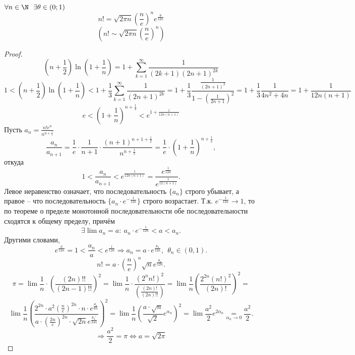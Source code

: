 \begin{Thm}
    $\forall n \in \N \ \ \exists \theta \in (0; 1)$
    \[ n! = \sqrt{2 \pi n} \left(\frac{n}{e}\right)^n e^{\frac{\theta}{12n}}\]
    \[ \left(n! \sim \sqrt{2 \pi n} \left(\frac{n}{e}\right)^n\right)\]
\end{Thm}

\begin{proof}
    \[ \left(n + \frac{1}{2} \right) \ln \left(1 + \frac{1}{n}\right) = 1 + \sum_{k = 1}^{\infty} \frac{1}{(2k + 1)(2n + 1)^{2k}}\]
    \[ 1 < \left(n + \frac{1}{2}\right) \ln \left(1 + \frac{1}{n}\right) < 1 + \frac{1}{3} \sum_{k = 1}^{\infty} \frac{1}{(2n + 1)^{2k}} = 1 + \frac{1}{3} \frac{\frac{1}{(2n + 1)^2}}{1 - \left(\frac{1}{2n + 1}\right)^2} = 1 + \frac{1}{3} \frac{1}{4n^2 + 4n} = 1 + \frac{1}{12n(n + 1)}\]
    \[ e < \left(1 + \frac{1}{n}\right)^{n + \frac{1}{2}} < e^{1 + \frac{1}{12n(n + 1)}}\]
    Пусть $a_n = \displaystyle \frac{n! e^n}{n ^{n + \frac{1}{2}}}$
    \[ \frac{a_n}{a_{n + 1}} = \frac{1}{e} \cdot \frac{1}{n + 1} \cdot \frac{\left(n + 1\right)^{n + 1 + \frac{1}{2}}}{n^{n + \frac{1}{2}}} = \frac{1}{e} \cdot \left(1 + \frac{1}{n}\right)^{n + \frac{1}{2}},\]
    откуда
    \[ 1 <  \frac{a_n}{a_{n +1}} < e^{\frac{1}{12n(n + 1)}} = \frac{e^{\frac{1}{12n}}}{e^{\frac{1}{12(n + 1)}}}.\]
    Левое неравенство означает, что последовательность $\{a_n\}$ строго убывает, а правое -- что последовательность $\{ \displaystyle a_n \cdot e^ {-\frac{1}{12n}}\}$ строго возрастает. Т.к. $\displaystyle e^{- \frac{1}{12n}} \to 1$, 
    то по теореме о пределе монотонной последовательности обе последовательности сходятся к общему пределу, причём 
    \[ \exists \lim a_n = a: \ \displaystyle a_n \cdot e^{- \frac{1}{12n}} < a < a_n.\]
    Другими словами,
    \[ e^{\frac{0}{12n}} = 1 < \frac{a_n}{a} < e^{\frac{1}{12n}} \Rightarrow a_n = a \cdot e^{\frac{\theta_n}{12n}}, \ \ \theta_n \in (0, 1).\] 
    \[ n! = a \cdot \left(\frac{n}{e}\right)^n \sqrt{n} e^{\frac{\theta_n}{12n}}.\]
    \[ \pi = \lim \frac{1}{n} \cdot \left( \frac{(2n)!!}{(2n - 1)!!}\right)^2 = \lim \frac{1}{n} \cdot \frac{(2^n n!)^2}{\left(\frac{(2n)!}{(2n)!!}\right)} = \lim \frac{1}{n} \left(\frac{2^{2n} (n!)^2}{(2n)!}\right)^2 =\]
    \[ \lim \frac{1}{n} \left(\frac{2^{2n} \cdot a^2 \left(\frac{n}{e}\right)^{2n} \cdot n \cdot e^{\frac{\theta_n}{6n}}}{a \cdot \left( \frac{2n}{e}\right)^{2n} \cdot \sqrt{2n} e^{\frac{\theta_n'}{24n}}}\right)^2 = \lim \frac{1}{n} \left( \frac{a \cdot \sqrt{n}}{\sqrt{2}}e^{\alpha_n}\right)^2 = \lim \frac{a^2}{2} e^{2\alpha_n} \underset{\alpha_n \to 0}{=} \frac{a^2}{2}.\]
    \[ \Rightarrow \frac{a^2}{2} = \pi \Leftrightarrow a = \sqrt{2 \pi} \]
\end{proof}

